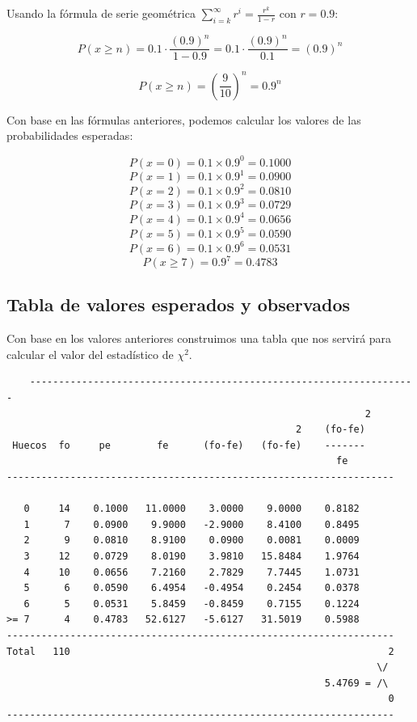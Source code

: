 Usando la fórmula de serie geométrica $\displaystyle\sum_{i=k}^\infty r^i = \frac{r^k}{1-r}$ con $r=0.9$:

$$P(x\geq n) = 0.1 \cdot \frac{(0.9)^n}{1-0.9} = 0.1 \cdot \frac{(0.9)^n}{0.1} = (0.9)^n$$

$$P(x\geq n) = \left(\frac{9}{10}\right)^n = 0.9^n$$



Con base en las fórmulas anteriores, podemos calcular los valores de las probabilidades esperadas:

$$P(x=0) = 0.1\times 0.9^0 = 0.1000$$
$$P(x=1) = 0.1\times 0.9^1 = 0.0900$$
$$P(x=2) = 0.1\times 0.9^2 = 0.0810$$
$$P(x=3) = 0.1\times 0.9^3 = 0.0729$$
$$P(x=4) = 0.1\times 0.9^4 = 0.0656$$
$$P(x=5) = 0.1\times 0.9^5 = 0.0590$$
$$P(x=6) = 0.1\times 0.9^6 = 0.0531$$
$$P(x\geq 7) =  0.9^7 = 0.4783$$

\subsection{Tabla de valores esperados y observados}
Con base en los valores anteriores construimos una tabla que nos servirá para calcular el valor del estadístico de $\chi^2$.
\begin{verbatim}
    -------------------------------------------------------------------
                                                              2
                                                  2    (fo-fe)
 Huecos  fo     pe        fe      (fo-fe)   (fo-fe)    -------
                                                         fe
-------------------------------------------------------------------

   0     14    0.1000   11.0000    3.0000    9.0000    0.8182
   1      7    0.0900    9.9000   -2.9000    8.4100    0.8495
   2      9    0.0810    8.9100    0.0900    0.0081    0.0009
   3     12    0.0729    8.0190    3.9810   15.8484    1.9764
   4     10    0.0656    7.2160    2.7829    7.7445    1.0731
   5      6    0.0590    6.4954   -0.4954    0.2454    0.0378
   6      5    0.0531    5.8459   -0.8459    0.7155    0.1224
>= 7      4    0.4783   52.6127   -5.6127   31.5019    0.5988
-------------------------------------------------------------------
Total   110                                                       2
                                                                \/
                                                       5.4769 = /\
                                                                  0
-------------------------------------------------------------------

\end{verbatim}

